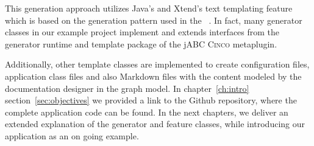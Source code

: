 This generation approach utilizes Java's and Xtend's text templating feature which is based on the generation pattern used in the ~\cite{model-driver-dev_jABC,jabc-home}. In fact, many generator classes in our example project implement and extends interfaces from the generator runtime and template package of the jABC \textsc{Cinco} metaplugin.

Additionally, other template classes are implemented to create configuration files, application class files and also Markdown files with the content modeled by the documentation designer in the graph model. In chapter~\ref{ch:intro} section~\ref{sec:objectives} we provided a link to the Github repository, where the complete application code can be found. In the next chapters, we deliver an extended explanation of the generator and feature classes, while introducing our application as an on going example.